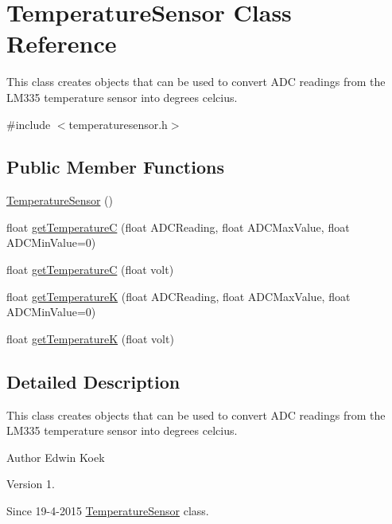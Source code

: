 \hypertarget{class_temperature_sensor}{\section{Temperature\-Sensor Class Reference}
\label{class_temperature_sensor}
}


This class creates objects that can be used to convert A\-D\-C readings from the L\-M335 temperature sensor into degrees celcius.  




{\ttfamily \#include $<$temperaturesensor.\-h$>$}

\subsection*{Public Member Functions}
\begin{DoxyCompactItemize}
\item 
\hyperlink{class_temperature_sensor_a2f8ba8784c8e8aebd3f88c402fb8319b}{Temperature\-Sensor} ()
\item 
float \hyperlink{class_temperature_sensor_ae5b26b781678c55076c31cd726e800ce}{get\-Temperature\-C} (float A\-D\-C\-Reading, float A\-D\-C\-Max\-Value, float A\-D\-C\-Min\-Value=0)
\item 
float \hyperlink{class_temperature_sensor_ae35e5da8bd5d04e2b26d86f8694f8ecf}{get\-Temperature\-C} (float volt)
\item 
float \hyperlink{class_temperature_sensor_a6aabb03d6a6606558c6b05d5bf792881}{get\-Temperature\-K} (float A\-D\-C\-Reading, float A\-D\-C\-Max\-Value, float A\-D\-C\-Min\-Value=0)
\item 
float \hyperlink{class_temperature_sensor_a9e5952c4f27eda9967901f69e3f2759e}{get\-Temperature\-K} (float volt)
\end{DoxyCompactItemize}


\subsection{Detailed Description}
This class creates objects that can be used to convert A\-D\-C readings from the L\-M335 temperature sensor into degrees celcius. 

\begin{DoxyAuthor}{Author}
Edwin Koek 
\end{DoxyAuthor}
\begin{DoxyVersion}{Version}
1. 
\end{DoxyVersion}
\begin{DoxySince}{Since}
19-\/4-\/2015 \hyperlink{class_temperature_sensor}{Temperature\-Sensor} class. 
\end{DoxySince}


